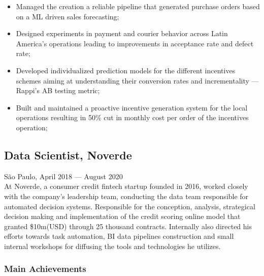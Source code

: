 \documentclass{article}
\newcommand{\jobdate}[3]{
\large
\vspace{0.05em} 
  {#1, #2 --- #3}
\vspace{0.5em} 
\\
}
\begin{document}
\begin{itemize}

\item{Managed the creation a reliable pipeline that generated purchase orders based on a ML driven sales forecasting;}
\item{Designed experiments in payment and courier behavior across Latin America's operations leading to improvements in acceptance rate and defect rate;}
\item{Developed individualized prediction models for the different incentives schemes aiming at understanding their conversion rates and incrementality --- Rappi's AB testing metric;}
\item{Built and maintained a proactive incentive generation system for the local operations resulting in 50\% cut in monthly cost per order of the incentives operation;}
\end{itemize}

\subsection{Data Scientist, Noverde}
\jobdate{São Paulo}{April 2018}{August 2020}

At Noverde, a consumer credit fintech startup founded in 2016, worked closely with the company's leadership team, conducting the data team responsible for automated decision systems. Responsible for the conception, analysis, strategical decision making and implementation of the credit scoring online model that granted \$10m(USD) through 25 thousand contracts. Internally also directed his efforts towards task automation, BI data pipelines construction and small internal workshops for diffusing the tools and technologies he utilizes.

\subsubsection{Main Achievements}
\end{document}
